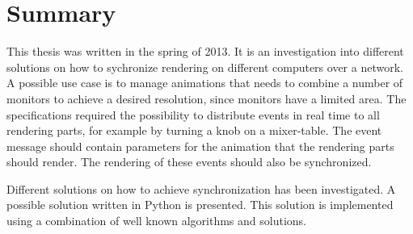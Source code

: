 \chapter{Summary}

This thesis was written in the spring of 2013. It is an investigation into different solutions on how to sychronize rendering on different computers over a network. A possible use case is to manage animations that needs to combine a number of monitors to achieve a desired resolution, since monitors have a limited area. The specifications required the possibility to distribute events in real time to all rendering parts, for example by turning a knob on a mixer-table. The event message should contain parameters for the animation that the rendering parts should render. The rendering of these events should also be synchronized. 

Different solutions on how to achieve synchronization has been investigated. A possible solution written in Python is presented. This solution is implemented using a combination of well known algorithms and solutions. 

